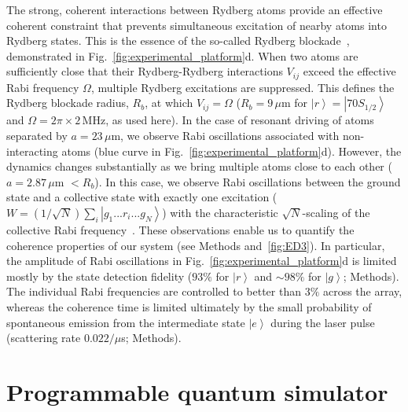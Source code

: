 \documentclass[prl,nobalancelastpage,twocolumn,superscriptaddress,nofootinbib]{revtex4}
\newcommand{\ket}[1]{\left|#1\right\rangle}
\begin{document}
The strong, coherent interactions between Rydberg atoms provide an effective
coherent constraint that prevents simultaneous excitation of nearby atoms into
Rydberg states. This  is the essence of the so-called Rydberg
blockade~\cite{Jaksch2000}, demonstrated in
Fig.~\ref{fig:experimental_platform}d.  When two atoms are sufficiently close
that their Rydberg-Rydberg interactions $V_{ij}$ exceed the effective Rabi
frequency $\Omega$, multiple Rydberg excitations are suppressed. This
defines the Rydberg blockade radius, $R_b$, at which $V_{ij} = \Omega$
($R_b=9\,\mu$m for $\ket{r}=\ket{70S_{1/2}}$ and $\Omega = 2\pi\times2\,$MHz, as
used here). In the case of resonant driving of atoms separated by $a=23\,\mu$m,
we observe Rabi oscillations associated with non-interacting atoms (blue curve
in Fig.~\ref{fig:experimental_platform}d). However, the dynamics changes
substantially as we bring multiple atoms close to each other ($a = 2.87\,\mu$m
$< R_b$). In this case, we observe Rabi oscillations between the ground state
and a collective state with exactly one excitation ($W=(1/\sqrt{N})\sum_i
\ket{g_1...r_i...g_N}$) with the characteristic $\sqrt{N}$-scaling of
the collective Rabi frequency~\cite{Dudin2012,Zeiher2015,Labuhn2016}. These
observations enable us to quantify the coherence properties of our system (see
Methods and~\ref{fig:ED3}). In particular, the amplitude of Rabi
oscillations in Fig.~\ref{fig:experimental_platform}d is limited mostly by the
state detection fidelity ($93\%$ for $\ket{r}$ and $\sim98\%$ for $\ket{g}$;
Methods). The individual Rabi frequencies are controlled to better than $3\%$
across the array, whereas the coherence time is limited ultimately by the small
probability of spontaneous emission from the intermediate state $\ket{e}$
during the laser pulse (scattering rate $0.022/\mu$s; Methods). 


 \section{Programmable quantum simulator} 
\end{document}
